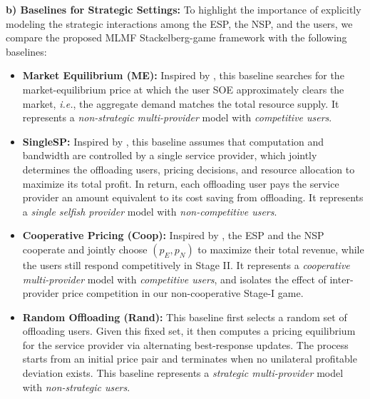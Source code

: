 \documentclass[lettersize,journal]{IEEEtran}
\newcommand{\ie}{\emph{i.e.}}
\begin{document}
\textbf{b) Baselines for Strategic Settings:}
To highlight the importance of explicitly modeling the strategic interactions among the ESP, the NSP, and the users, we compare the proposed MLMF Stackelberg-game framework with the following baselines:
\begin{itemize}
    \item \textbf{Market Equilibrium (ME):} Inspired by \cite{liu2022resource}, this baseline searches for the market-equilibrium price at which the user SOE approximately clears the market, \ie, the aggregate demand matches the total resource supply. It represents a \emph{non-strategic multi-provider} model with \emph{competitive users}.

    \item \textbf{SingleSP:} Inspired by \cite{tutuncuoglu2024joint}, this baseline assumes that computation and bandwidth are controlled by a single service provider, which jointly determines the offloading users, pricing decisions, and resource allocation to maximize its total profit. In return, each offloading user pays the service provider an amount equivalent to its cost saving from offloading.
    It represents a \emph{single selfish provider} model with \emph{non-competitive users}.

    \item \textbf{Cooperative Pricing (Coop):} Inspired by \cite{liao2026cooperative}, the ESP and the NSP cooperate and jointly choose $(p_E, p_N)$ to maximize their total revenue, while the users still respond competitively in Stage II. It represents a \emph{cooperative multi-provider} model with \emph{competitive users}, and isolates the effect of inter-provider price competition in our non-cooperative Stage-I game.

    \item \textbf{Random Offloading (Rand):} 
    This baseline first selects a random set of offloading users. Given this fixed set, it then computes a pricing equilibrium for the service provider via alternating best-response updates. The process starts from an initial price pair and terminates when no unilateral profitable deviation exists. This baseline represents a \emph{strategic multi-provider} model with \emph{non-strategic users}.
\end{itemize}


\end{document}

